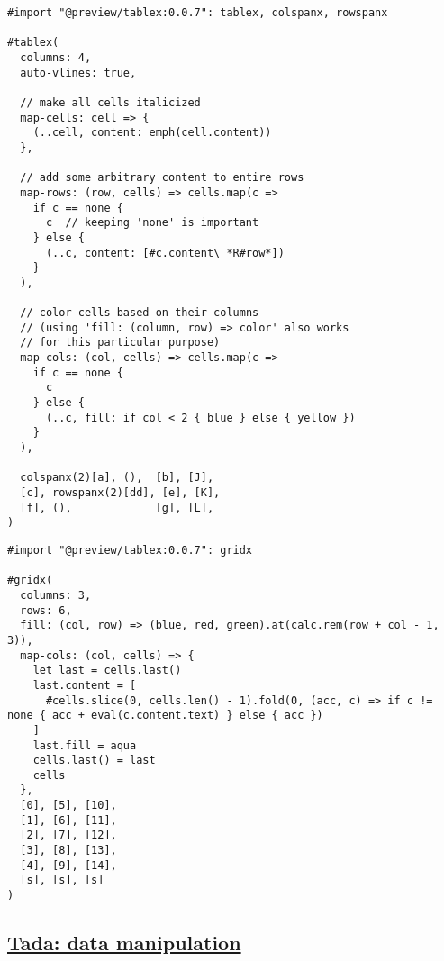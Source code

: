\begin{verbatim}
#import "@preview/tablex:0.0.7": tablex, colspanx, rowspanx

#tablex(
  columns: 4,
  auto-vlines: true,

  // make all cells italicized
  map-cells: cell => {
    (..cell, content: emph(cell.content))
  },

  // add some arbitrary content to entire rows
  map-rows: (row, cells) => cells.map(c =>
    if c == none {
      c  // keeping 'none' is important
    } else {
      (..c, content: [#c.content\ *R#row*])
    }
  ),

  // color cells based on their columns
  // (using 'fill: (column, row) => color' also works
  // for this particular purpose)
  map-cols: (col, cells) => cells.map(c =>
    if c == none {
      c
    } else {
      (..c, fill: if col < 2 { blue } else { yellow })
    }
  ),

  colspanx(2)[a], (),  [b], [J],
  [c], rowspanx(2)[dd], [e], [K],
  [f], (),             [g], [L],
)
\end{verbatim}

\pandocbounded{}

\begin{verbatim}
#import "@preview/tablex:0.0.7": gridx

#gridx(
  columns: 3,
  rows: 6,
  fill: (col, row) => (blue, red, green).at(calc.rem(row + col - 1, 3)),
  map-cols: (col, cells) => {
    let last = cells.last()
    last.content = [
      #cells.slice(0, cells.len() - 1).fold(0, (acc, c) => if c != none { acc + eval(c.content.text) } else { acc })
    ]
    last.fill = aqua
    cells.last() = last
    cells
  },
  [0], [5], [10],
  [1], [6], [11],
  [2], [7], [12],
  [3], [8], [13],
  [4], [9], [14],
  [s], [s], [s]
)
\end{verbatim}

\pandocbounded{}

\subsection{\texorpdfstring{\hyperref[tada-data-manipulation]{Tada: data
manipulation}}{Tada: data manipulation}}\label{tada-data-manipulation}

